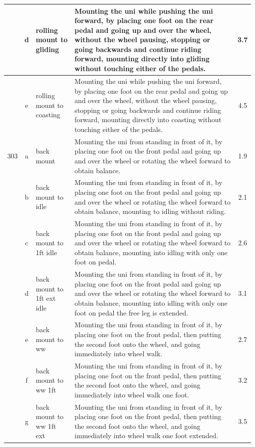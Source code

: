\begin{longtable}{|r|c|p{4cm}|p{8cm}|c|}
\hline
  & d & rolling mount to gliding  & Mounting the uni while pushing the uni forward, by placing one foot on the rear pedal and going up and over the wheel, without the wheel pausing, stopping or going backwards and continue riding forward, mounting directly into gliding without touching either of the pedals.  & 3.7 \\ 
\hline
  & e & rolling mount to coasting & Mounting the uni while pushing the uni forward, by placing one foot on the rear pedal and going up and over the wheel, without the wheel pausing, stopping or going backwards and continue riding forward, mounting directly into coasting without touching either of the pedals. & 4.5 \\ 
\hline
303 & a & back mount  & Mounting the uni from standing in front of it, by placing one foot on the front pedal and going up and over the wheel or rotating the wheel forward to obtain balance.  & 1.9 \\ 
\hline
  & b & back mount to idle  & Mounting the uni from standing in front of it, by placing one foot on the front pedal and going up and over the wheel or rotating the wheel forward to obtain balance, mounting to idling without riding. & 2.1 \\ 
\hline
  & c & back mount to 1ft idle  & Mounting the uni from standing in front of it, by placing one foot on the front pedal and going up and over the wheel or rotating the wheel forward to obtain balance, mounting into idling with only one foot on pedal.  & 2.6 \\ 
\hline
  & d & back mount to 1ft ext idle  & Mounting the uni from standing in front of it, by placing one foot on the front pedal and going up and over the wheel or rotating the wheel forward to obtain balance, mounting into idling with only one foot on pedal the free leg is extended. & 3.1 \\ 
\hline
  & e & back mount to ww  & Mounting the uni from standing in front of it, by placing one foot on the front pedal, then putting the second foot onto the wheel, and going immediately into wheel walk.  & 2.7 \\ 
\hline
  & f & back mount to ww 1ft  & Mounting the uni from standing in front of it, by placing one foot on the front pedal, then putting the second foot onto the wheel, and going immediately into wheel walk one foot. & 3.2 \\ 
\hline
  & g & back mount to ww 1ft ext  & Mounting the uni from standing in front of it, by placing one foot on the front pedal, then putting the second foot onto the wheel, and going immediately into wheel walk one foot extended.  & 3.5 \\ 

\end{longtable}
